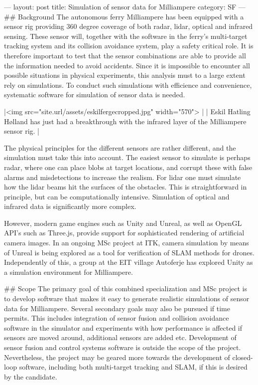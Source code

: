 ---
layout: post
title: Simulation of sensor data for Milliampere
category: SF
---
## Background
The autonomous ferry Milliampere has been equipped with a sensor rig providing 360 degree coverage of both radar, lidar, optical and infrared sensing. 
These sensor will, together with the software in the ferry's multi-target tracking system and its collision avoidance system, play a safety critical role. 
It is therefore important to test that the sensor combinations are able to provide all the information needed to avoid accidents. 
Since it is impossible to encounter all possible situations in physical experiments, this analysis must to a large extent rely on simulations. 
To conduct such simulations with efficience and convenience, systematic software for simulation of sensor data is needed. 

|<img src="{{site.url}}/assets/eskilfergecropped.jpg" width="570"> | 
| Eskil Hatling Hølland has just had a breakthrough with the infrared layer of the Milliampere sensor rig. | 

The physical principles for the different sensors are rather different, and the simulation must take this into account. 
The easiest sensor to simulate is perhaps radar, where one can place blobs at target locations, and corrupt these with false alarms and misdetections to increase the realism. 
For lidar one must simulate how the lidar beams hit the surfaces of the obstacles. This is straightforward in principle, but can be computationally intensive. 
Simulation of optical and infrared data is significantly more complex. 

However, modern game engines such as Unity and Unreal, as well as OpenGL API's such as Three.js, provide support for sophisticated rendering of artificial camera images. 
In an ongoing MSc project at ITK, camera simulation by means of Unreal is being explored as a tool for verification of SLAM methods for drones. 
Independently of this, a group at the EIT village Autoferje has explored Unity as a simulation environment for Milliampere. 

## Scope
The primary goal of this combined specialization and MSc project is to develop software that makes it easy to generate realistic simulations of sensor data for Milliampere. 
Several secondary goals may also be pursued if time permits. This includes integration of sensor fusion and collision avoidance software in the simulator and experiments
with how performance is affected if sensors are moved around, additional sensors are added etc. Development of sensor fusion and control systems software is outside the scope of the project. Nevertheless, the project may be geared more towards the development of closed-loop software, including both multi-target tracking and SLAM, if this is desired by the candidate. 

